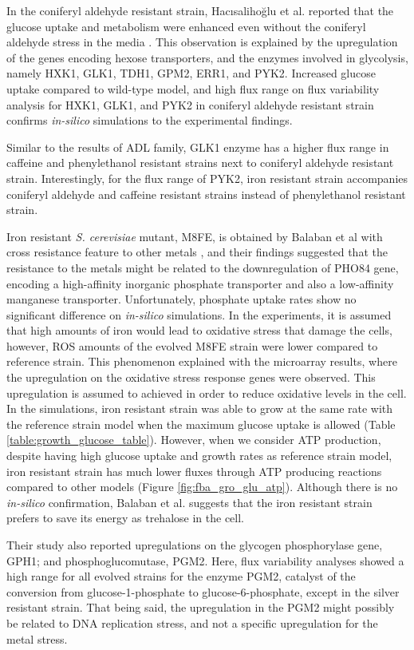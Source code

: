 In the coniferyl aldehyde resistant strain, Hacısalihoğlu et al. reported that the glucose uptake and metabolism were enhanced even without the coniferyl aldehyde stress in the media \cite{Hacsaliholu2019}. This observation is explained by the upregulation of the genes encoding hexose transporters, and the enzymes involved in glycolysis, namely HXK1, GLK1, TDH1, GPM2, ERR1, and PYK2. Increased glucose uptake compared to wild-type model, and high flux range on flux variability analysis for HXK1, GLK1, and PYK2 in coniferyl aldehyde resistant strain confirms \emph{in-silico} simulations to the experimental findings.

Similar to the results of ADL family, GLK1 enzyme has a higher flux range in caffeine and phenylethanol resistant strains next to coniferyl aldehyde resistant strain. Interestingly, for the flux range of PYK2, iron resistant strain accompanies coniferyl aldehyde and caffeine resistant strains instead of phenylethanol resistant strain.

Iron resistant \emph{S. cerevisiae} mutant, M8FE, is obtained by Balaban et al with cross resistance feature to other metals \cite{balaban2020evolutionary}, and their findings suggested that the resistance to the metals might be related to the downregulation of PHO84 gene, encoding a high-affinity inorganic phosphate transporter and also a low-affinity manganese transporter. Unfortunately, phosphate uptake rates show no significant difference on \emph{in-silico} simulations. In the experiments, it is assumed that high amounts of iron would lead to oxidative stress that damage the cells, however, ROS amounts of the evolved M8FE strain were lower compared to reference strain. This phenomenon explained with the microarray results, where the upregulation on the oxidative stress response genes were observed. This upregulation is assumed to achieved in order to reduce oxidative levels in the cell. In the simulations, iron resistant strain was able to grow at the same rate with the reference strain model when the maximum glucose uptake is allowed (Table \ref{table:growth_glucose_table}). However, when we consider ATP production, despite having high glucose uptake and growth rates as reference strain model, iron resistant strain has much lower fluxes through ATP producing reactions compared to other models (Figure \ref{fig:fba_gro_glu_atp}). Although there is no \emph{in-silico} confirmation, Balaban et al. suggests that the iron resistant strain prefers to save its energy as trehalose in the cell.

Their study also reported upregulations on the glycogen phosphorylase gene, GPH1; and phosphoglucomutase, PGM2. Here, flux variability analyses showed a high range for all evolved strains for the enzyme PGM2, catalyst of the conversion from glucose-1-phosphate to glucose-6-phosphate, except in the silver resistant strain. That being said, the upregulation in the PGM2 might possibly be related to DNA replication stress, and not a specific upregulation for the metal stress.

